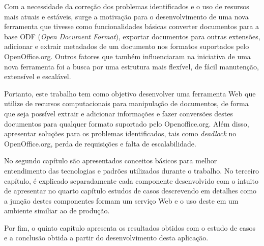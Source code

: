 Com a necessidade da correção dos problemas identificados e o uso de resursos mais atuais e estáveis, surge a motivação para o desenvolvimento de uma nova ferramenta que tivesse como funcionalidades básicas converter documentos para a base ODF (\textit{Open Document Format}), exportar documentos para outras extensões, adicionar e extrair metadados de um documento nos formatos suportados pelo OpenOffice.org. Outros fatores que também influenciaram na iniciativa de uma nova ferramenta foi a busca por uma estrutura mais flexível, de fácil manutenção, extensível e escalável.

Portanto, este trabalho tem como objetivo desenvolver uma ferramenta Web que utilize de recursos computacionais para manipulação de documentos, de forma que seja possível extrair e adicionar informações e fazer conversões destes documentos para qualquer formato suportado pelo Openoffice.org. Além disso, apresentar soluções para os problemas identificados, tais como \textit{deadlock} no OpenOffice.org, perda de requisições e falta de escalabilidade.

No segundo capítulo são apresentados conceitos básicos para melhor entendimento das tecnologias e padrões utilizados durante o trabalho. No terceiro capítulo, é explicado separadamente cada componente desenvolvido com o intuito de apresentar no quarto capítulo estudos de casos descrevendo em detalhes como a junção destes componentes formam um serviço Web e o uso deste em um ambiente similiar ao de produção.

Por fim, o quinto capítulo apresenta os resultados obtidos com o estudo de casos e a conclusão obtida a partir do desenvolvimento desta aplicação.